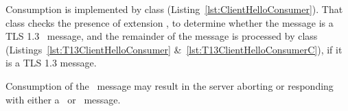 \begin{tcolorbox}
Consumption is implemented by class 
 (Listing~\ref{lst:ClientHelloConsumer}).
That class checks the presence of extension \TLSsupportedVersions, to determine
whether the message is a TLS 1.3 \ClientHello\ message, and the remainder of the 
message is processed by class  
(Listings~\ref{lst:T13ClientHelloConsumer} \&~\ref{lst:T13ClientHelloConsumerC}), 
if it is a TLS 1.3 message. %
\begin{comment}
which is reliant on classes \code{SSLExtensions} 
and \code{SSLExtension} 
(Appendix~\ref{sec:extensions}).
\end{comment}
Consumption of the \ClientHello\ message may result in the server aborting or 
responding with either a \ServerHello\ or \HelloRetryRequest\ message.
\end{tcolorbox}

\begin{comment}
\footnotetext{Class \code{ClientHello.ClientHelloConsumer} implements
  interface \code{SSLConsumer}, which defines a single method, namely, 
  \code{void consume(ConnectionContext context, ByteBuffer message) throws IOException}.
  Similarly, class \code{ClientHello.T13ClientHelloConsumer} implements
  interface \code{HandshakeConsumer}, which defines method
  \code{void consume(ConnectionContext context, HandshakeMessage message) throws IOException}.
  Parameter \code{context} defines the active context in both interfaces 
  and may be cast to children \code{ClientHandshakeContext} and \code{ServerHandshakeContext}, 
  as seen in Line~770 of Listing~\ref{lst:ClientHelloConsumer}, for instance.
  \textcolor{red}{Are these details worth knowing?}
}
\end{comment}

